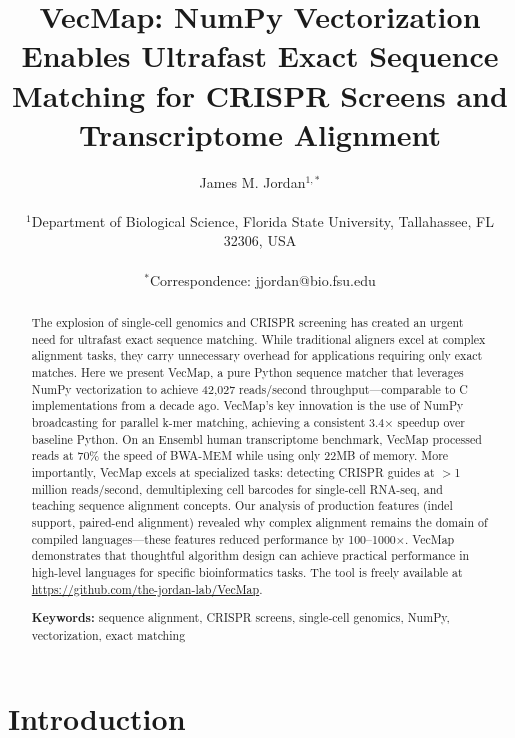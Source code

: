 \documentclass[12pt]{article}
\begin{document}
\title{\textbf{VecMap: NumPy Vectorization Enables Ultrafast Exact Sequence Matching for CRISPR Screens and Transcriptome Alignment}}

\author{James M. Jordan$^{1,*}$ \\
\\
$^1$Department of Biological Science, Florida State University, Tallahassee, FL 32306, USA \\
\\
$^*$Correspondence: jjordan@bio.fsu.edu
}

\date{}

\maketitle

\begin{abstract}
The explosion of single-cell genomics and CRISPR screening has created an urgent need for ultrafast exact sequence matching. While traditional aligners excel at complex alignment tasks, they carry unnecessary overhead for applications requiring only exact matches. Here we present VecMap, a pure Python sequence matcher that leverages NumPy vectorization to achieve 42,027 reads/second throughput---comparable to C implementations from a decade ago. VecMap's key innovation is the use of NumPy broadcasting for parallel k-mer matching, achieving a consistent 3.4× speedup over baseline Python. On an Ensembl human transcriptome benchmark, VecMap processed reads at 70\% the speed of BWA-MEM while using only 22MB of memory. More importantly, VecMap excels at specialized tasks: detecting CRISPR guides at $>$1 million reads/second, demultiplexing cell barcodes for single-cell RNA-seq, and teaching sequence alignment concepts. Our analysis of production features (indel support, paired-end alignment) revealed why complex alignment remains the domain of compiled languages---these features reduced performance by 100--1000×. VecMap demonstrates that thoughtful algorithm design can achieve practical performance in high-level languages for specific bioinformatics tasks. The tool is freely available at \url{https://github.com/the-jordan-lab/VecMap}.

\textbf{Keywords:} sequence alignment, CRISPR screens, single-cell genomics, NumPy, vectorization, exact matching
\end{abstract}

\section{Introduction}
\end{document}
